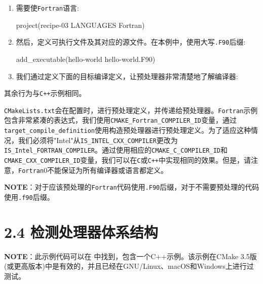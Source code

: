 \begin{enumerate}
\item 需要使\texttt{Fortran}语言:

\begin{codebox}[cmake]
project(recipe-03 LANGUAGES Fortran)
\end{codebox}

\item 然后，定义可执行文件及其对应的源文件。在本例中，使用大写\texttt{.F90}后缀:

\begin{codebox}[cmake]
add_executable(hello-world hello-world.F90)
\end{codebox}

\item 我们通过定义下面的目标编译定义，让预处理器非常清楚地了解编译器:


\end{enumerate}

其余行为与\texttt{C++}示例相同。


\texttt{CMakeLists.txt}会在配置时，进行预处理定义，并传递给预处理器。\texttt{Fortran}示例包含非常紧凑的表达式，我们使用\texttt{CMAKE\_Fortran\_COMPILER\_ID}变量，通过\texttt{target\_compile\_definition}使用构造预处理器进行预处理定义。为了适应这种情况，我们必须将"Intel"从\texttt{IS\_INTEL\_CXX\_COMPILER}更改为\texttt{IS\_Intel\_FORTRAN\_COMPILER}。通过使用相应的\texttt{CMAKE\_C\_COMPILER\_ID}和\texttt{CMAKE\_CXX\_COMPILER\_ID}变量，我们可以在\texttt{C}或\texttt{C++}中实现相同的效果。但是，请注意，\texttt{Fortran}0不能保证为所有编译器或语言都定义。

\begin{myInfoBox}
\textbf{NOTE}：对于应该预处理的\texttt{Fortran}代码使用\texttt{.F90}后缀，对于不需要预处理的代码使用\texttt{.f90}后缀。
\end{myInfoBox}


\section{2.4 检测处理器体系结构}

\begin{myInfoBox}
\textbf{NOTE}：此示例代码可以在  中找到，包含一个C++示例。该示例在CMake 3.5版(或更高版本)中是有效的，并且已经在GNU/Linux、macOS和Windows上进行过测试。
\end{myInfoBox}

